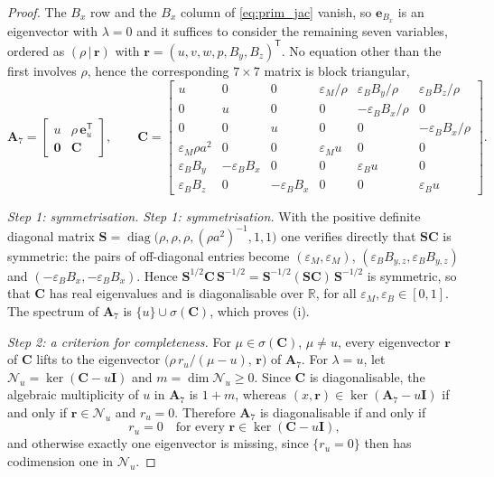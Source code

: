 \documentclass[a4paper,fleqn]{cas-sc}
\theoremstyle{remark}
\begin{document}
\begin{proof}
The $B_x$ row and the $B_x$ column of \eqref{eq:prim_jac} vanish, so $\mathbf e_{B_x}$ is
an eigenvector with $\lambda=0$ and it suffices to consider the remaining
seven variables, ordered as $(\rho\,|\,\mathbf r)$ with
$\mathbf r=(u,v,w,p,B_y,B_z)^{\mathsf T}$. No equation other than the first
involves $\rho$, hence the corresponding $7\times7$ matrix is block triangular,
\begin{equation}\label{eq:A7}
\mathbf A_7=\begin{bmatrix} u & \rho\,\mathbf e_u^{\mathsf T}\\[2pt]
\mathbf 0 & \mathbf C\end{bmatrix},
\qquad
\mathbf C=\begin{bmatrix}
u & 0 & 0 & \varepsilon_M/\rho & \varepsilon_B B_y/\rho & \varepsilon_B B_z/\rho\\
0 & u & 0 & 0 & -\varepsilon_B B_x/\rho & 0\\
0 & 0 & u & 0 & 0 & -\varepsilon_B B_x/\rho\\
\varepsilon_M\rho a^2 & 0 & 0 & \varepsilon_M u & 0 & 0\\
\varepsilon_B B_y & -\varepsilon_B B_x & 0 & 0 & \varepsilon_B u & 0\\
\varepsilon_B B_z & 0 & -\varepsilon_B B_x & 0 & 0 & \varepsilon_B u
\end{bmatrix}.
\end{equation}
 
\emph{Step 1: symmetrisation.}
\emph{Step 1: symmetrisation.}
With the positive definite diagonal matrix
$\mathbf S=\operatorname{diag}\bigl(\rho,\rho,\rho,(\rho a^2)^{-1},1,1\bigr)$
one verifies directly that $\mathbf S\mathbf C$ is symmetric: the pairs of
off-diagonal entries become $(\varepsilon_M,\varepsilon_M)$,
$(\varepsilon_BB_{y,z},\varepsilon_BB_{y,z})$ and
$(-\varepsilon_BB_x,-\varepsilon_BB_x)$. Hence
$\mathbf S^{1/2}\mathbf C\,\mathbf S^{-1/2}
=\mathbf S^{-1/2}(\mathbf S\mathbf C)\,\mathbf S^{-1/2}$ is symmetric, so that
$\mathbf C$ has real eigenvalues and is diagonalisable over $\mathbb R$, for
all $\varepsilon_M,\varepsilon_B\in[0,1]$. The spectrum of $\mathbf A_7$ is
$\{u\}\cup\sigma(\mathbf C)$, which proves (i).
 
\emph{Step 2: a criterion for completeness.}
For $\mu\in\sigma(\mathbf C)$, $\mu\neq u$, every eigenvector $\mathbf r$ of
$\mathbf C$ lifts to the eigenvector
$\bigl(\rho\,r_u/(\mu-u),\,\mathbf r\bigr)$ of $\mathbf A_7$. For $\lambda=u$,
let $\mathcal N_u=\ker(\mathbf C-u\mathbf I)$ and $m=\dim\mathcal N_u\ge0$.
Since $\mathbf C$ is diagonalisable, the algebraic multiplicity of $u$ in
$\mathbf A_7$ is $1+m$, whereas
$(x,\mathbf r)\in\ker(\mathbf A_7-u\mathbf I)$ if and only if
$\mathbf r\in\mathcal N_u$ and $r_u=0$. Therefore $\mathbf A_7$ is
diagonalisable if and only if
\begin{equation}\label{eq:criterion}
r_u=0\quad\text{for every }\mathbf r\in\ker(\mathbf C-u\mathbf I),
\end{equation}
and otherwise exactly one eigenvector is missing, since $\{r_u=0\}$ then has
codimension one in $\mathcal N_u$.
 

\end{proof}
\end{document}

